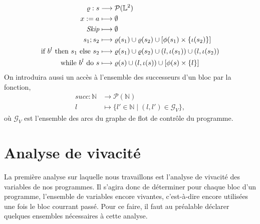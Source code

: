 \documentclass[a4paper, 12pt]{article}
\begin{document}
\begin{align*}
	\varrho : s &\longrightarrow \mathcal{P}(\mathbb{L}^2) \\
	{x}\space:=\space{a} &\longmapsto \emptyset \\
	\textit{Skip} &\longmapsto \emptyset \\
	{s_1}\space;\space{s_2} &\longmapsto \varrho(s_1) \cup \varrho(s_2) \cup [\phi(s_1)\times\{\iota(s_2)\}] \\
	\text{if }{b^l}\text{ then }{s_1}\text{ else }{s_2} &\longmapsto \varrho(s_1)\cup\varrho(s_2)\cup(l, \iota(s_1))\cup(l, \iota(s_2)) \\
	\text{while }{b^l}\text{ do }{s} &\longmapsto \varrho(s)\cup(l,\iota(s))\cup[\phi(s)\times\{l\}]
\end{align*}
On introduira aussi un accès à l'ensemble des successeurs d'un bloc par la fonction,
\begin{align*}
	succ : \mathbb{N} &\longrightarrow \mathcal{P}(\mathbb{N})\\
	l &\longmapsto \{l' \in \mathbb{N} \mid (l, l') \in \mathcal{G}_V\},
\end{align*}
où $\mathcal{G}_V$ est l'ensemble des arcs du graphe de flot de contrôle du programme.

\section{Analyse de vivacité}
La première analyse sur laquelle nous travaillons est l'analyse de vivacité des variables de nos programmes. 
Il s'agira donc de déterminer pour chaque bloc d'un programme, l'ensemble de variables encore vivantes, c'est-à-dire
encore utilisées une fois le bloc courrant passé. Pour ce faire, il faut au préalable déclarer quelques ensembles 
nécessaires à cette analyse.
\end{document}
